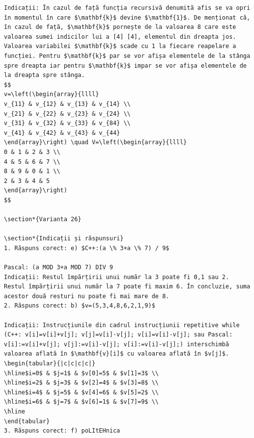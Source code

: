 \documentclass[10pt]{article}
\begin{document}
\begin{verbatim}
Indicații: În cazul de față funcția recursivă denumită afis se va opri în momentul în care $\mathbf{k}$ devine $\mathbf{1}$. De menționat că, în cazul de față, $\mathbf{k}$ pornește de la valoarea 8 care este valoarea sumei indicilor lui a [4] [4], elementul din dreapta jos.
Valoarea variabilei $\mathbf{k}$ scade cu 1 la fiecare reapelare a funcției. Pentru $\mathbf{k}$ par se vor afișa elementele de la stânga spre dreapta iar pentru $\mathbf{k}$ impar se vor afișa elementele de la dreapta spre stânga.
$$
v=\left(\begin{array}{llll}
v_{11} & v_{12} & v_{13} & v_{14} \\
v_{21} & v_{22} & v_{23} & v_{24} \\
v_{31} & v_{32} & v_{33} & v_{84} \\
v_{41} & v_{42} & v_{43} & v_{44}
\end{array}\right) \quad V=\left(\begin{array}{llll}
0 & 1 & 2 & 3 \\
4 & 5 & 6 & 7 \\
8 & 9 & 0 & 1 \\
2 & 3 & 4 & 5
\end{array}\right)
$$

\section*{Varianta 26}

\section*{Indicații și răspunsuri}
1. Răspuns corect: e) $C++:(a \% 3+a \% 7) / 9$

Pascal: (a MOD 3+a MOD 7) DIV 9
Indicații: Restul împărțirii unui număr la 3 poate fi 0,1 sau 2. Restul împărțirii unui număr la 7 poate fi maxim 6. În concluzie, suma acestor două resturi nu poate fi mai mare de 8.
2. Răspuns corect: b) $v=(5,3,4,8,6,2,1,9)$

Indicații: Instrucțiunile din cadrul instrucțiunii repetitive while (C++: v[i]=v[i]+v[j]; v[j]=v[i]-v[j]; v[i]=v[i]-v[j]; sau Pascal: v[i]:=v[i]+v[j]; v[j]:=v[i]-v[j]; v[i]:=v[i]-v[j];) interschimbă valoarea aflată în $\mathbf{v}[i]$ cu valoarea aflată în $v[j]$.
\begin{tabular}{|c|c|c|c|}
\hline$i=0$ & $j=1$ & $v[0]=5$ & $v[1]=3$ \\
\hline$i=2$ & $j=3$ & $v[2]=4$ & $v[3]=8$ \\
\hline$i=4$ & $j=5$ & $v[4]=6$ & $v[5]=2$ \\
\hline$i=6$ & $j=7$ & $v[6]=1$ & $v[7]=9$ \\
\hline
\end{tabular}
3. Răspuns corect: f) poLItEHnica


\end{verbatim}
\end{document}
